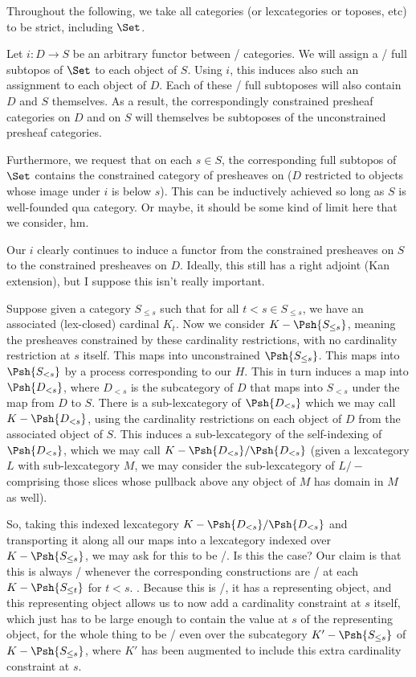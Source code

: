 \begin{construction}
Throughout the following, we take all categories (or lexcategories or toposes, etc) to be strict, including $\Set$.

Let $i : D \to S$ be an arbitrary functor between \setsmall/ categories. We will assign a \setsmall/ full subtopos of $\Set$ to each object of $S$. Using $i$, this induces also such an assignment to each object of $D$. Each of these \setsmall/ full subtoposes will also contain $D$ and $S$ themselves. As a result, the correspondingly constrained presheaf categories on $D$ and on $S$ will themselves be subtoposes of the unconstrained presheaf categories.

Furthermore, we request that on each $s \in S$, the corresponding full subtopos of $\Set$ contains the constrained category of presheaves on ($D$ restricted to objects whose image under $i$ is below $s$). This can be inductively achieved so long as $S$ is well-founded qua category. Or maybe, it should be some kind of limit here that we consider, hm.

Our $i$ clearly continues to induce a functor from the constrained presheaves on $S$ to the constrained presheaves on $D$. Ideally, this still has a right adjoint (Kan extension), but I suppose this isn't really important.


\end{construction}

Suppose given a category $S_{\leq s}$ such that for all $t < s \in S_{\leq s}$, we have an associated (lex-closed) cardinal $K_t$. Now we consider $K-\Psh{S_{\leq s}}$, meaning the presheaves constrained by these cardinality restrictions, with no cardinality restriction at $s$ itself. This maps into unconstrained $\Psh{S_{\leq s}}$. This maps into $\Psh{S_{< s}}$ by a process corresponding to our $H$. This in turn induces a map into $\Psh{D_{< s}}$, where $D_{< s}$ is the subcategory of $D$ that maps into $S_{< s}$ under the map from $D$ to $S$. There is a sub-lexcategory of $\Psh{D_{< s}}$ which we may call $K-\Psh{D_{< s}}$, using the cardinality restrictions on each object of $D$ from the associated object of $S$. This induces a sub-lexcategory of the self-indexing of $\Psh{D_{< s}}$, which we may call $K-\Psh{D_{< s}}/\Psh{D_{< s}}$ (given a lexcategory $L$ with sub-lexcategory $M$, we may consider the sub-lexcategory of $L/-$ comprising those slices whose pullback above any object of $M$ has domain in $M$ as well). 

So, taking this indexed lexcategory $K-\Psh{D_{< s}}/\Psh{D_{< s}}$ and transporting it along all our maps into a lexcategory indexed over $K-\Psh{S_{\leq s}}$, we may ask for this to be \setsmall/. Is this the case? Our claim is that this is always \setsmall/ whenever the corresponding constructions are \setsmall/ at each $K-\Psh{S_{\leq t}}$ for $t < s$. \TODO. Because this is \setsmall/, it has a representing object, and this representing object allows us to now add a cardinality constraint at $s$ itself, which just has to be large enough to contain the value at $s$ of the representing object, for the whole thing to be \repsmall/ even over the subcategory $K'-\Psh{S_{\leq s}}$ of $K-\Psh{S_{\leq s}}$, where $K'$ has been augmented to include this extra cardinality constraint at $s$.


